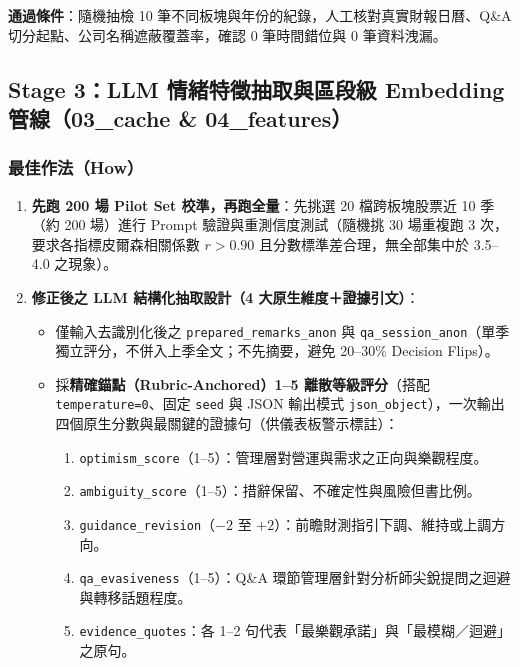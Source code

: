 \documentclass[11pt, a4paper]{article}
\begin{document}
\begin{gatebox}
\textbf{通過條件}：隨機抽檢 10 筆不同板塊與年份的紀錄，人工核對真實財報日曆、Q\&A 切分起點、公司名稱遮蔽覆蓋率，確認 0 筆時間錯位與 0 筆資料洩漏。
\end{gatebox}

\subsection{Stage 3：LLM 情緒特徵抽取與區段級 Embedding 管線（03\_cache \& 04\_features）}

\subsubsection{最佳作法（How）}
\begin{enumerate}[leftmargin=1.5em, itemsep=2pt]
    \item \textbf{先跑 200 場 Pilot Set 校準，再跑全量}：先挑選 20 檔跨板塊股票近 10 季（約 200 場）進行 Prompt 驗證與重測信度測試（隨機挑 30 場重複跑 3 次，要求各指標皮爾森相關係數 $r > 0.90$ 且分數標準差合理，無全部集中於 3.5--4.0 之現象）。
    \item \textbf{修正後之 LLM 結構化抽取設計（4 大原生維度＋證據引文）}：
    \begin{itemize}[leftmargin=1.2em]
        \item 僅輸入去識別化後之 \texttt{prepared\_remarks\_anon} 與 \texttt{qa\_session\_anon}（單季獨立評分，不併入上季全文；不先摘要，避免 20--30\% Decision Flips）。
        \item 採\textbf{精確錨點（Rubric-Anchored）1--5 離散等級評分}（搭配 \texttt{temperature=0}、固定 \texttt{seed} 與 JSON 輸出模式 \texttt{json\_object}），一次輸出四個原生分數與最關鍵的證據句（供儀表板警示標註）：
        \begin{enumerate}[leftmargin=1.4em, itemsep=1pt]
            \item \texttt{optimism\_score}（1--5）：管理層對營運與需求之正向與樂觀程度。
            \item \texttt{ambiguity\_score}（1--5）：措辭保留、不確定性與風險但書比例。
            \item \texttt{guidance\_revision}（$-2$ 至 $+2$）：前瞻財測指引下調、維持或上調方向。
            \item \texttt{qa\_evasiveness}（1--5）：Q\&A 環節管理層針對分析師尖銳提問之迴避與轉移話題程度。
            \item \texttt{evidence\_quotes}：各 1--2 句代表「最樂觀承諾」與「最模糊／迴避」之原句。

\end{enumerate}
\end{itemize}
\end{enumerate}
\end{document}
